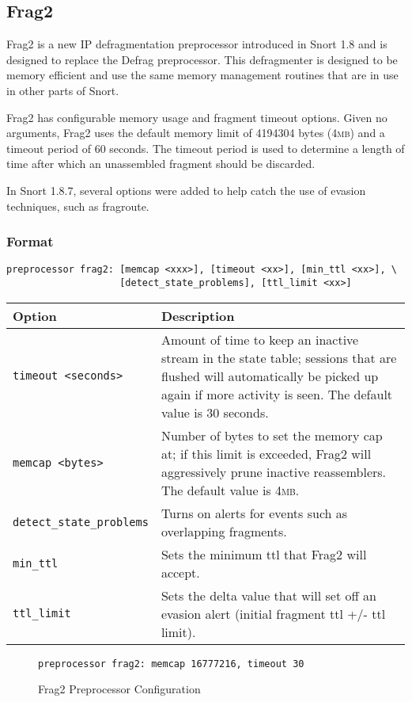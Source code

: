 \documentclass[english]{report}
\begin{document}
\subsection{Frag2\label{Frag2 Section}}

Frag2 is a new IP defragmentation preprocessor introduced in Snort 1.8 and is 
designed to replace the Defrag preprocessor.
This defragmenter is designed to be memory efficient and use the same
memory management routines that are in use in other parts of Snort. 

Frag2 has configurable memory usage and fragment timeout options.
Given no arguments, Frag2 uses the default memory limit of 4194304
bytes (4\textsc{mb}) and a timeout period of 60 seconds. The timeout
period is used to determine a length of time after which an unassembled fragment
should be discarded.

In Snort 1.8.7, several options were added to help catch the use of
evasion techniques, such as fragroute. 


\subsubsection{Format}

\begin{verbatim}
preprocessor frag2: [memcap <xxx>], [timeout <xx>], [min_ttl <xx>], \
                    [detect_state_problems], [ttl_limit <xx>] 
\end{verbatim}
\begin{tabular}{| l | p{5in} |}
\hline
\textbf{Option} & \textbf{Description}\\
\hline
\hline
\texttt{timeout~<seconds>} & Amount of time to keep an inactive stream in
the state table; sessions that are flushed will automatically be picked
up again if more activity is seen. The default value is 30 seconds.\\
\hline
\texttt{memcap~<bytes>} & Number of bytes to set the memory cap at; if this
limit is exceeded, Frag2 will aggressively prune inactive reassemblers. The
default value is 4\textsc{mb}.\\
\hline
\texttt{detect\_state\_problems} & Turns on alerts for events such as overlapping
fragments.\\
\hline
\texttt{min\_ttl} & Sets the minimum ttl that Frag2 will accept.\\
\hline
\texttt{ttl\_limit} & Sets the delta value that will set off an evasion alert
(initial fragment ttl +/- ttl limit). \\
\hline
\end{tabular}
%
\begin{figure}[!hbpt]
\begin{verbatim}
preprocessor frag2: memcap 16777216, timeout 30
\end{verbatim}

\caption{Frag2 Preprocessor Configuration \label{Frag2 Example}}
\end{figure}
\end{document}

